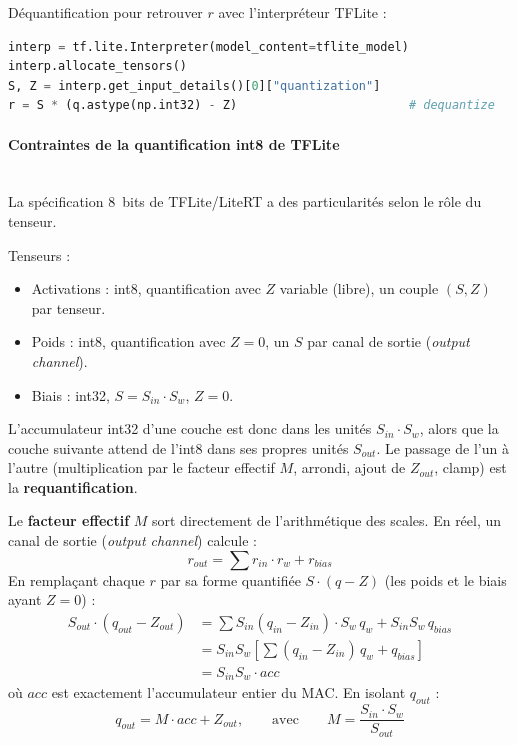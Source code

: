 \documentclass[11pt,a4paper]{article}
\begin{document}
Déquantification pour retrouver $r$ avec l'interpréteur TFLite :
\begin{lstlisting}[language=Python]
interp = tf.lite.Interpreter(model_content=tflite_model)
interp.allocate_tensors()
S, Z = interp.get_input_details()[0]["quantization"]
r = S * (q.astype(np.int32) - Z)                        # dequantize
\end{lstlisting}

\paragraph{Contraintes de la quantification int8 de TFLite}\mbox{}\\

La spécification 8~bits de TFLite/LiteRT a des particularités selon le rôle
du tenseur.

Tenseurs :
\begin{itemize}
  \item Activations : int8, quantification avec $Z$ variable (libre), un
    couple $(S, Z)$ par tenseur.
  \item Poids : int8, quantification avec $Z = 0$, un $S$ par canal de sortie
    (\emph{output channel}).
  \item Biais : int32, $S = S_{in} \cdot S_w$, $Z = 0$.
\end{itemize}

L'accumulateur int32 d'une couche est donc dans les unités
$S_{in} \cdot S_w$, alors que la couche suivante attend de l'int8 dans ses
propres unités $S_{out}$. Le passage de l'un à l'autre (multiplication par le
facteur effectif $M$, arrondi, ajout de $Z_{out}$, clamp) est la
\textbf{requantification}.

Le \textbf{facteur effectif} $M$ sort directement de l'arithmétique des
scales. En réel, un canal de sortie (\emph{output channel}) calcule :
\begin{equation*}
  r_{out} = \sum r_{in} \cdot r_w + r_{bias}
\end{equation*}
En remplaçant chaque $r$ par sa forme quantifiée $S \cdot (q - Z)$ (les poids
et le biais ayant $Z = 0$) :
\begin{align*}
  S_{out} \cdot (q_{out} - Z_{out})
    &= \sum S_{in} (q_{in} - Z_{in}) \cdot S_w\, q_w
       + S_{in} S_w\, q_{bias} \\
    &= S_{in} S_w \left[ \sum (q_{in} - Z_{in})\, q_w + q_{bias} \right] \\
    &= S_{in} S_w \cdot acc
\end{align*}
où $acc$ est exactement l'accumulateur entier du MAC. En isolant $q_{out}$ :
\begin{equation*}
  q_{out} = M \cdot acc + Z_{out},
  \qquad \text{avec} \qquad
  M = \frac{S_{in} \cdot S_w}{S_{out}}
\end{equation*}
\end{document}
